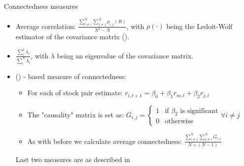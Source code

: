 \documentclass{beamer}
\begin{document}
\begin{frame}{Connectedness measures}

\begin{itemize}
    \item Average correlation: $\frac{\sum_{i \neq i}^{N} \sum_{j \neq j}^{N} \rho_{i,j}(R)}{N^2-N}$,  with $\rho(\cdot)$ being the Ledoit-Wolf estimator of the covariance matrix (\cite{ledoit}).
    \item $\frac{\sum_{i}^{k} \lambda_i}{\sum_{i}^{N} \lambda_i}$, with $\lambda$ being an eigenvalue of the covariance matrix. 
    \item (\cite{granger}) - based measure of connectedness:
    \begin{itemize}
        \item For each of stock pair estimate: $r_{i,t+1} = \beta_0 + \beta_1 r_{m, t} + \beta_2 r_{j, t}$
        \item The "causality" matrix is set as: $G_{i,j} = \begin{cases}
            1  & \text{if } \beta_2 \text{ is significant} \\
            0 & \text{otherwise}
          \end{cases} \forall i \neq j$
        \item As with before we calculate average connectedness: $\frac{\sum_{i \neq j}^{N} \sum_{j \neq i}^{N} G_{i,j}}{ N \times (N-1)}$
    \end{itemize}

    Last two measures are as described in \cite{billio}
\end{itemize}

\end{frame}
\end{document}
